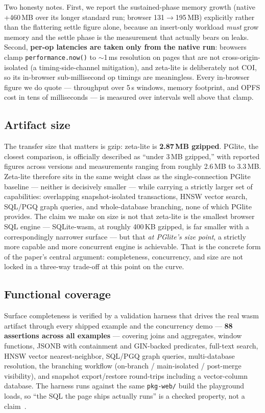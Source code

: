 \documentclass[11pt]{article}
\begin{document}
Two honesty notes. First, we report the sustained-phase memory growth (native
+460\,MB over its longer standard run; browser 131$\rightarrow$195\,MB) explicitly
rather than the flattering settle figure alone, because an insert-only workload
\emph{must} grow memory and the settle phase is the measurement that actually bears
on leaks. Second, \textbf{per-op latencies are taken only from the native run}:
browsers clamp \texttt{performance.now()} to $\sim$1\,ms resolution on pages that are
not cross-origin-isolated (a timing-side-channel mitigation), and zeta-lite is
deliberately not COI, so its in-browser sub-millisecond op timings are meaningless.
Every in-browser figure we do quote --- throughput over 5\,s windows, memory
footprint, and OPFS cost in tens of milliseconds --- is measured over intervals well
above that clamp.

\subsection{Artifact size}

The transfer size that matters is gzip: zeta-lite is \textbf{2.87\,MB gzipped}.
PGlite, the closest comparison, is officially described as ``under 3\,MB gzipped,''
with reported figures across versions and measurements ranging from roughly 2.6\,MB
to 3.3\,MB. Zeta-lite therefore sits in the same weight class as the
single-connection PGlite baseline --- neither is decisively smaller --- while
carrying a strictly larger set of capabilities: overlapping snapshot-isolated
transactions, HNSW vector search, SQL/PGQ graph queries, and whole-database
branching, none of which PGlite provides. The claim we make on size is not that
zeta-lite is the smallest browser SQL engine --- SQLite-wasm, at roughly 400\,KB
gzipped, is far smaller with a correspondingly narrower surface --- but that
\emph{at PGlite's size point}, a strictly more capable and more concurrent engine is
achievable. That is the concrete form of the paper's central argument: completeness,
concurrency, and size are not locked in a three-way trade-off at this point on the
curve.

\subsection{Functional coverage}

Surface completeness is verified by a validation harness that drives the real wasm
artifact through every shipped example and the concurrency demo --- \textbf{88
assertions across all examples} --- covering joins and aggregates, window functions,
JSONB with containment and GIN-backed predicates, full-text search, HNSW vector
nearest-neighbor, SQL/PGQ graph queries, multi-database resolution, the branching
workflow (on-branch / main-isolated / post-merge visibility), and snapshot
export/restore round-trips including a vector-column database. The harness runs
against the same \texttt{pkg-web/} build the playground loads, so ``the SQL the page
ships actually runs'' is a checked property, not a claim~\cite{validation}.
\end{document}
